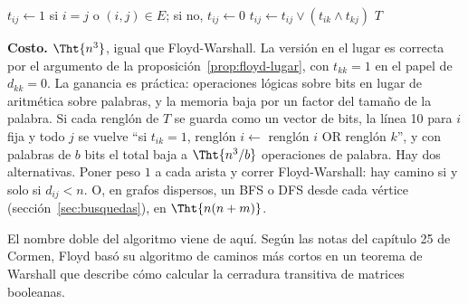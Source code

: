 \documentclass[11pt,letterpaper]{article}
\begin{document}
\begin{algorithm}[H]
\caption{\textsc{Cerradura-Transitiva}$(G)$, en el lugar}
\label{alg:cerradura-transitiva}
\begin{algorithmic}[1]
      \State $t_{ij} \gets 1$ si $i = j$ o $(i, j) \in E$; si no,
             $t_{ij} \gets 0$
    \EndFor
  \EndFor
        \State $t_{ij} \gets t_{ij} \lor (t_{ik} \land t_{kj})$
      \EndFor
    \EndFor
  \EndFor
  \State \Return $T$
\EndProcedure
\end{algorithmic}
\end{algorithm}

\textbf{Costo.} $\Tht{n^3}$, igual que Floyd-Warshall. La versión en
el lugar es correcta por el argumento de la
proposición~\ref{prop:floyd-lugar}, con $t_{kk} = 1$ en el papel de
$d_{kk} = 0$. La ganancia es práctica: operaciones lógicas sobre bits
en lugar de aritmética sobre palabras, y la memoria baja por un factor
del tamaño de la palabra. Si cada renglón de $T$ se guarda como un
vector de bits, la línea 10 para $i$ fija y todo $j$ se vuelve ``si
$t_{ik} = 1$, renglón $i \gets$ renglón $i$ OR renglón $k$'', y con
palabras de $b$ bits el total baja a $\Tht{n^3 / b}$ operaciones de
palabra. Hay dos alternativas. Poner peso $1$ a cada arista y correr
Floyd-Warshall: hay camino si y solo si $d_{ij} < n$. O, en grafos
dispersos, un BFS o DFS desde cada vértice
(sección~\ref{sec:busquedas}), en $\Tht{n(n + m)}$.

El nombre doble del algoritmo viene de aquí. Según las notas del
capítulo 25 de Cormen, Floyd basó su algoritmo de caminos más cortos
en un teorema de Warshall que describe cómo calcular la cerradura
transitiva de matrices booleanas.
\end{document}

